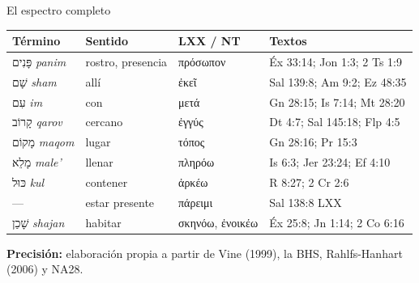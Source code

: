 \documentclass[hyperref={bookmarks=false},aspectratio=169]{beamer}
\newcommand{\heb}[1]{\mbox{\foreignlanguage{hebrew}{#1}}}
\newcommand{\grc}[1]{\foreignlanguage{ancientgreek}{#1}}
\newcommand{\precision}[1]{{\footnotesize\color{gris}\textbf{Precisión:} #1}}
\begin{document}
\begin{frame}{El espectro completo}
\scriptsize\renewcommand{\arraystretch}{1.1}
\begin{tabular}{@{}>{\RaggedRight\arraybackslash}p{2.4cm}>{\RaggedRight\arraybackslash}p{2.6cm}>{\RaggedRight\arraybackslash}p{3.0cm}>{\RaggedRight\arraybackslash}p{3.8cm}@{}}
\toprule
\textbf{Término} & \textbf{Sentido} & \textbf{LXX / NT} & \textbf{Textos} \\ \midrule
\heb{פָּנִים} \emph{panim} & rostro, presencia & \grc{πρόσωπον} & Éx 33:14; Jon 1:3; 2 Ts 1:9 \\
\heb{שָׁם} \emph{sham} & allí & \grc{ἐκεῖ} & Sal 139:8; Am 9:2; Ez 48:35 \\
\heb{עִם} \emph{im} & con & \grc{μετά} & Gn 28:15; Is 7:14; Mt 28:20 \\
\heb{קָרוֹב} \emph{qarov} & cercano & \grc{ἐγγύς} & Dt 4:7; Sal 145:18; Flp 4:5 \\
\heb{מָקוֹם} \emph{maqom} & lugar & \grc{τόπος} & Gn 28:16; Pr 15:3 \\
\heb{מָלֵא} \emph{male'} & llenar & \grc{πληρόω} & Is 6:3; Jer 23:24; Ef 4:10 \\
\heb{כּוּל} \emph{kul} & contener & \grc{ἀρκέω} & 1 R 8:27; 2 Cr 2:6 \\
--- & estar presente & \grc{πάρειμι} & Sal 138:8 LXX \\
\heb{שָׁכַן} \emph{shajan} & habitar & \grc{σκηνόω}, \grc{ἐνοικέω} & Éx 25:8; Jn 1:14; 2 Co 6:16 \\
\bottomrule
\end{tabular}\par\smallskip
\precision{elaboración propia a partir de Vine (1999), la BHS, Rahlfs-Hanhart (2006) y NA28.}
\end{frame}
\end{document}
